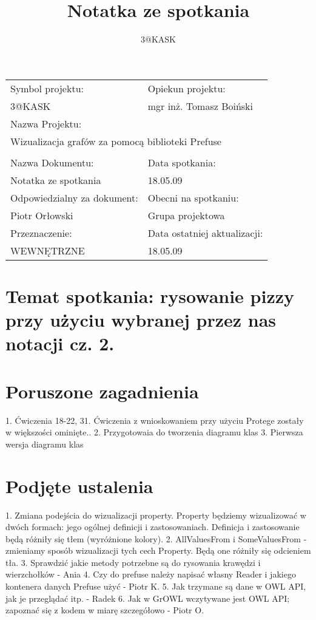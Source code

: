\documentclass[a4paper,10pt]{article}
\title{Notatka ze spotkania}
\author{3@KASK}
\begin{document}



\maketitle


\begin{center}
\begin{tabular}{|p{7cm}|p{7cm}|}
\hline
Symbol projektu: & Opiekun projektu:   \tabularnewline 
3@KASK & mgr inż. Tomasz Boiński    \tabularnewline \hline
\multicolumn{2}{|l|}{Nazwa Projektu: } \tabularnewline
\multicolumn{2}{|l|}{Wizualizacja grafów za pomocą biblioteki Prefuse } \tabularnewline 
\hline
\multicolumn{2}{l}{ } \tabularnewline %
\hline 
Nazwa Dokumentu: & Data spotkania:   \tabularnewline 
Notatka ze spotkania & 18.05.09 \tabularnewline \hline
Odpowiedzialny za dokument: & Obecni na spotkaniu:   \tabularnewline 
Piotr Orłowski & Grupa projektowa \tabularnewline \hline
Przeznaczenie: & Data ostatniej aktualizacji:   \tabularnewline 
WEWNĘTRZNE & 18.05.09 \tabularnewline \hline
\end{tabular}
\end{center}



\section{Temat spotkania: rysowanie pizzy przy użyciu wybranej przez nas notacji cz. 2.}


\section{Poruszone zagadnienia}
1. Ćwiczenia 18-22, 31. Ćwiczenia z wnioskowaniem przy użyciu Protege zostały w większości ominięte..
2. Przygotowaia do tworzenia diagramu klas
3. Pierwsza wersja diagramu klas

\section{Podjęte ustalenia}
1. Zmiana podejścia do wizualizacji property. Property będziemy wizualizować w dwóch formach: jego ogólnej definicji i zastosowaniach. Definicja i zastosowanie będą różniły się tłem (wyróżnione kolory).
2. AllValuesFrom i SomeValuesFrom - zmieniamy sposób wizualizacji tych cech Property. Będą one różniły się odcieniem tła.  
3. Sprawdzić jakie metody potrzebne są do rysowania krawędzi i wierzchołków - Ania
4. Czy do prefuse należy napisać własny Reader i jakiego kontenera danych Prefuse użyć - Piotr K.
5. Jak trzymane są dane w OWL API, jak je przeglądać itp. - Radek
6. Jak w GrOWL wczytywane jest OWL API; zapoznać się z kodem w miarę szczegółowo - Piotr O.



\clearpage
{}
{}

\end{document}

